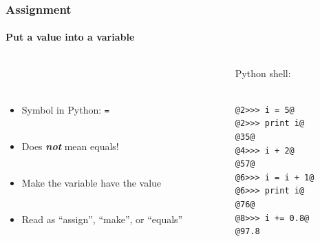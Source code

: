 \documentclass{beamer}
\begin{document}
\begin{frame}[fragile]
\frametitle{Assignment}
\framesubtitle{Put a value into a variable}
\large
  \begin{columns}[T]
    \begin{column}{.5\textwidth} 
\ \\ 

\ \\ 


\begin{itemize}


\item<1-> Symbol in Python: \texttt{=}\\ \
 \item<1-> Does \textbf{\textit{\alert{not}}} mean equals!\\ \
 \item<2->  Make the variable have the value \\ \

 \item<2-> Read as ``assign'', ``make'', or ``equals'' \\ \


\end{itemize}
     \end{column}
     
         \begin{column}{.5\textwidth} 
         Python shell: \\ \
\begin{lstlisting}[style=base]
@2>>> i = 5@
@2>>> print i@
@35@
@4>>> i + 2@
@57@
@6>>> i = i + 1@
@6>>> print i@
@76@
@8>>> i += 0.8@
@97.8
\end{lstlisting}

    \end{column}
    \end{columns}

\end{frame}
\end{document}
